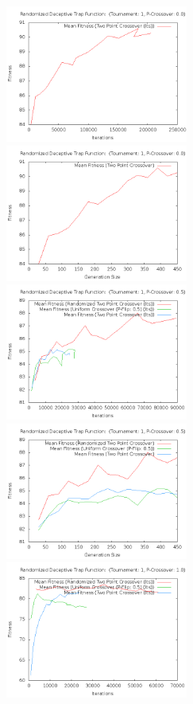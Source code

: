 \documentclass[10pt]{article}
\begin{document}
\begin{figure}[h!]
  \centering
    \includegraphics[height=170px]{img/RandomizedDeceptiveTrapFunctionRandomIters.png}
    \includegraphics[height=170px]{img/RandomizedDeceptiveTrapFunctionRandomGens.png}
    \includegraphics[height=170px]{img/RandomizedDeceptiveTrapFunctionBothIters.png}
    \includegraphics[height=170px]{img/RandomizedDeceptiveTrapFunctionBothGens.png}
    \includegraphics[height=170px]{img/RandomizedDeceptiveTrapFunctionCrossoverIters.png}

\end{figure}
\end{document}
